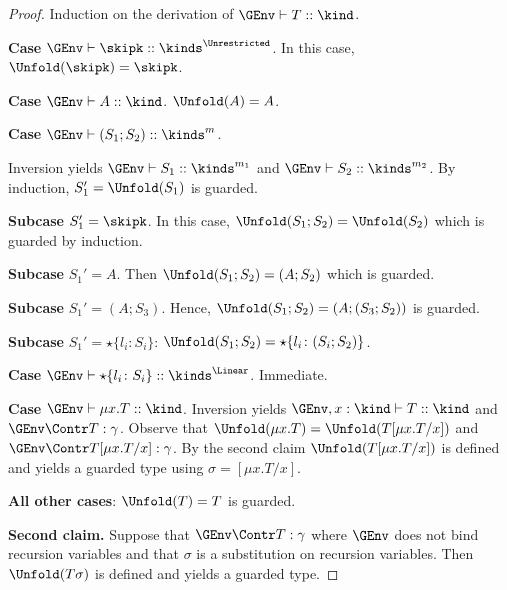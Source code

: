 \begin{proof}
  Induction on the derivation of  $\GEnv \vdash T :: \kind$.

  \textbf{Case }$\GEnv \vdash \skipk :: \kinds^\Unrestricted$.
  In this case, $\Unfold (\skipk) = \skipk$.

  \textbf{Case }$\GEnv \vdash A :: \kind$. $\Unfold (A) = {A}$.


  \textbf{Case }$\GEnv \vdash (S_1;S_2) :: \kinds^m$.

  Inversion yields $\GEnv \vdash S_1 :: \kinds^{m_1}$ and  $\GEnv
  \vdash S_2 :: \kinds^{m_2}$. By induction, $S_1' = \Unfold (S_1)$ is
  guarded.

  \textbf{Subcase }$S_1' = \skipk$. In this case, $\Unfold (S_1;S_2) =
  \Unfold (S_2)$ which is guarded by induction.

  \textbf{Subcase }$S_1' = A$. Then $\Unfold (S_1;S_2) = (A; S_2)$
  which is guarded.

  \textbf{Subcase }$S_1' = (A; S_3)$. Hence, $\Unfold (S_1;S_2) = (A; (S_3; S_2))$ is guarded.

  \textbf{Subcase }$S_1' = \star\{l_i\colon S_i\}$: $\Unfold
  (S_1;S_2) = \star\{l_i\colon (S_i; S_2) \}$.


  \textbf{Case }$\GEnv \vdash \star\{l_i\colon S_i\}
  :: \kinds^\Linear$. Immediate.



  \textbf{Case }$\GEnv \vdash \mu x. T :: \kind$.
%
  Inversion yields $\GEnv, x:\kind \vdash T :: \kind$ and
  $\GEnv \Contr T : \gamma$. Observe that
  $\Unfold (\mu x.T) = \Unfold (T[\mu x.T/x])$ and
  $\GEnv \Contr T[\mu x.T/x] : \gamma$. By the second claim 
  $\Unfold (T[\mu x.T/x])$ is defined and yields a guarded type using
  $\sigma = [\mu x.T/x]$.

  \textbf{All other cases}: $\Unfold (T) = T$ is guarded.
  
  \textbf{Second claim.}
  Suppose that  $\GEnv \Contr T :  \gamma$ where $\GEnv$ does not bind
  recursion variables and that  $\sigma$ is a substitution on recursion variables.
  Then  $\Unfold (T\sigma)$ is defined and yields a guarded type.


\end{proof}
